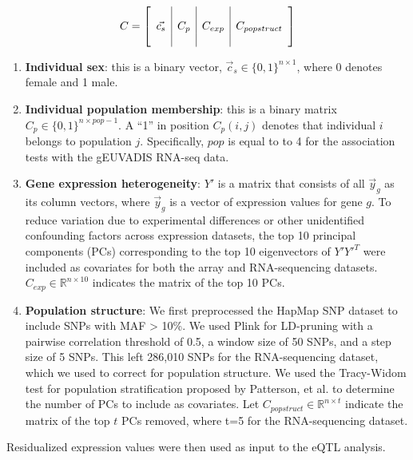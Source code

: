\begin{equation}
C = \left[\begin{array}{c | c | c | c}
&&& \\
\vec{c_s} & C_p & C_{exp} & C_{popstruct} \\ 
&&& \\
\end{array}\right]
\end{equation}
   
\begin{enumerate}
\item
  \textbf{Individual sex}: this is a binary vector,
  $\vec{c}_s \in \{0,1\}^{n\times 1}$, where 0 denotes female and 1
  male.
\item
  \textbf{Individual population membership}: this is a binary matrix
  $C_{p} \in \{0,1\}^{n\times pop-1}$. A
  ``1'' in position $C_{p}(i,j)$ denotes that individual $i$ belongs to
  population $j$. Specifically, $pop$ is equal to to 4 for the association
  tests with the gEUVADIS RNA-seq data.
\item
  \textbf{Gene expression heterogeneity}: $Y'$ is a matrix that
  consists of all $\vec{y}_g$ as its column vectors, where $\vec{y}_g$ is a vector of expression values for gene $g$. To reduce variation
  due to experimental differences or other unidentified confounding
  factors across expression datasets, the top 10 principal components
  (PCs) corresponding to the top 10 eigenvectors of $Y'Y'^T$ were included
  as covariates for both the array and RNA-sequencing datasets.
  $C_{exp} \in \mathbb{R}^{n\times 10}$ indicates the matrix of the top
  10 PCs.
\item
  \textbf{Population structure}: We first preprocessed the HapMap SNP
  dataset to include SNPs with MAF \textgreater{} 10\%. We used Plink
  \cite{PurcellNealeTodd-BrownEtAl2007} for LD-pruning with a pairwise correlation threshold of
  0.5, a window size of 50 SNPs, and a step size of 5 SNPs. This left
  286,010 SNPs for the RNA-sequencing dataset, which we used to correct for population structure. We
  used the Tracy-Widom test for population stratification proposed by
  Patterson, et al. \cite{PattersonPriceReich2006} to determine the number of PCs to
  include as covariates. Let $C_{popstruct}\in \mathbb{R}^{n\times t}$
  indicate the matrix of the top $t$ PCs removed, where t=5 for the
  RNA-sequencing dataset.
\end{enumerate}

Residualized expression values were then used as input to the eQTL
analysis.


